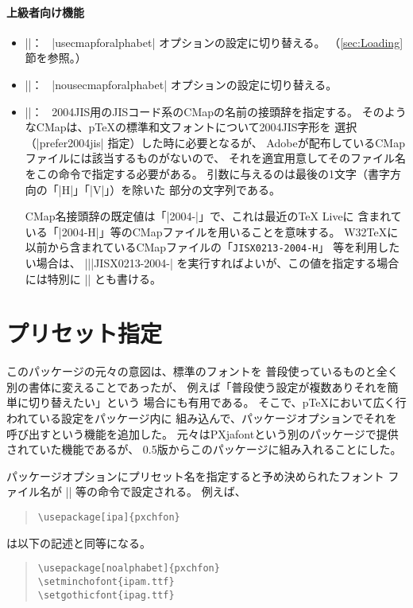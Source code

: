 \documentclass[a4paper,uplatex]{jsarticle}
\newcommand{\Pkg}[1]{\textsf{#1}}
\newcommand{\Meta}[1]{$\langle$\mbox{}#1\mbox{}$\rangle$}
\newcommand{\Means}{：\ }
\providecommand{\pTeX}{p\TeX}
\begin{document}
\paragraph{上級者向け機能}
\begin{itemize}
\item |\usecmapforalphabet|\Means
  |usecmapforalphabet| オプションの設定に切り替える。
  （\ref{sec:Loading}節を参照。）
\item |\nousecmapforalphabet|\Means
  |nousecmapforalphabet| オプションの設定に切り替える。
\item |\setnewglyphcmapprefix{|\Meta{文字列}|}|\Means
  2004JIS用のJISコード系のCMapの名前の接頭辞を指定する。
  そのようなCMapは、{\pTeX}の標準和文フォントについて2004JIS字形を
  選択（|prefer2004jis| 指定）した時に必要となるが、
  Adobeが配布しているCMapファイルには該当するものがないので、
  それを適宜用意してそのファイル名をこの命令で指定する必要がある。
  引数に与えるのは最後の1文字（書字方向の「|H|」「|V|」）を除いた
  部分の文字列である。\par
  CMap名接頭辞の既定値は「|2004-|」で、これは最近のTeX Liveに
  含まれている「|2004-H|」等のCMapファイルを用いることを意味する。
  W32TeXに以前から含まれているCMapファイルの「\texttt{JISX0213-2004-H}」
  等を利用したい場合は、
  |\setnewglyphcmapprefix|\linebreak[0]|{JISX0213-2004-}|
  を実行すればよいが、この値を指定する場合には特別に %
  |\setnewglyphcmapprefix{*}|
  とも書ける。
\end{itemize}

\section{プリセット指定}
\label{sec:Preset}

このパッケージの元々の意図は、標準のフォントを
普段使っているものと全く別の書体に変えることであったが、
例えば「普段使う設定が複数ありそれを簡単に切り替えたい」という
場合にも有用である。
そこで、{\pTeX}において広く行われている設定をパッケージ内に
組み込んで、パッケージオプションでそれを呼び出すという機能を追加した。
元々は\Pkg{PXjafont}という別のパッケージで提供されていた機能であるが、
0.5版からこのパッケージに組み入れることにした。

パッケージオプションにプリセット名を指定すると予め決められたフォント
ファイル名が |\setminchofont| 等の命令で設定される。
例えば、
\begin{quote}\small\begin{verbatim}
\usepackage[ipa]{pxchfon}
\end{verbatim}\end{quote}
は以下の記述と同等になる。
\begin{quote}\small\begin{verbatim}
\usepackage[noalphabet]{pxchfon}
\setminchofont{ipam.ttf}
\setgothicfont{ipag.ttf}
\end{verbatim}\end{quote}
\end{document}
